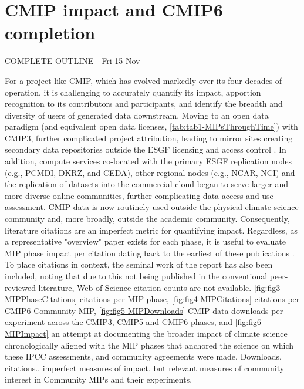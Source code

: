 \documentclass[gmd, preprint]{copernicus}
\def\cred#1{{\color{red}#1}}
\def\cblue#1{{\color{blue}#1}}
\begin{document}
\section{CMIP impact and CMIP6 completion}
\label{sec:CMIP6Completion}
\cblue{COMPLETE OUTLINE - Fri 15 Nov}

\cred{
For a project like CMIP, which has evolved markedly over its four decades of operation, it is challenging to accurately quantify its impact, apportion recognition to its contributors and participants, and identify the breadth and diversity of users of generated data downstream. Moving to an open data paradigm (and equivalent open data licenses, \autoref{tab:tab1-MIPsThroughTime}) with CMIP3, further complicated project attribution, leading to mirror sites creating secondary data repositories outside the ESGF licensing and access control \citep{balaji_requirements_2018}. In addition, compute services co-located with the primary ESGF replication nodes (e.g., PCMDI, DKRZ, and CEDA), other regional nodes (e.g., NCAR, NCI) and the replication of datasets into the commercial cloud \citep[e.g., PANGEO;][]{abernathey_cmip6_2020} began to serve larger and more diverse online communities, further complicating data access and use assessment.
}
\cred{
CMIP data is now routinely used outside the physical climate science community and, more broadly, outside the academic community. Consequently, literature citations are an imperfect metric for quantifying impact. Regardless, as a representative "overview" paper exists for each phase, it is useful to evaluate MIP phase impact per citation dating back to the earliest of these publications \citep[FANGIO;][]{cess_intercomparison_1990}. To place citations in context, the seminal work of the \citep{charney_carbon_1979} report has also been included, noting that due to this not being published in the conventional peer-reviewed literature, Web of Science citation counts are not available. 
}
\cred{
\autoref{fig:fig3-MIPPhaseCitations} citations per MIP phase, \autoref{fig:fig4-MIPCitations} citations per CMIP6 Community MIP, \autoref{fig:fig5-MIPDownloads} CMIP data downloads per experiment across the CMIP3, CMIP5 and CMIP6 phases, and \autoref{fig:fig6-MIPImpact} an attempt at documenting the broader impact of climate science chronologically aligned with the MIP phases that anchored the science on which these IPCC assessments, and community agreements were made.
}
\cred{
Downloads, citations.. imperfect measures of impact, but relevant measures of community interest in Community MIPs and their experiments.
}
\end{document}
